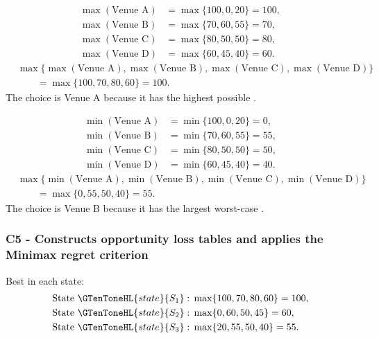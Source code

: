 	\[
	\begin{aligned}
		\max(\text{Venue A}) &= \max\{100,0,20\}=100,\\
		\max(\text{Venue B}) &= \max\{70,60,55\}=70,\\
		\max(\text{Venue C}) &= \max\{80,50,50\}=80,\\
		\max(\text{Venue D}) &= \max\{60,45,40\}=60.
	\end{aligned}
	\]
	\[
	\begin{aligned}
		&\max\{\max(\text{Venue A}),\max(\text{Venue B}),
		\max(\text{Venue C}),\max(\text{Venue D})\}\\
		&\qquad=\max\{100,70,80,60\}
		=100.
	\end{aligned}
	\]
	The  choice is Venue A because it has the highest possible .
	
	\[
	\begin{aligned}
		\min(\text{Venue A}) &= \min\{100,0,20\}=0,\\
		\min(\text{Venue B}) &= \min\{70,60,55\}=55,\\
		\min(\text{Venue C}) &= \min\{80,50,50\}=50,\\
		\min(\text{Venue D}) &= \min\{60,45,40\}=40.
	\end{aligned}
	\]
	\[
	\begin{aligned}
		&\max\{\min(\text{Venue A}),\min(\text{Venue B}),
		\min(\text{Venue C}),\min(\text{Venue D})\}\\
		&\qquad=\max\{0,55,50,40\}
		=55.
	\end{aligned}
	\]
	The  choice is Venue B because it has the largest worst-case .
	
	\subsubsection*{C5 - Constructs opportunity loss tables and applies the Minimax regret criterion}
	\label{subsec:event-venue-3x4-c5}
	
	Best  in each state:
	\[
	\begin{aligned}
		\text{State }\GTenToneHL{state}{S_1}:\;&\max\{100,70,80,60\}=100,\\
		\text{State }\GTenToneHL{state}{S_2}:\;&\max\{0,60,50,45\}=60,\\
		\text{State }\GTenToneHL{state}{S_3}:\;&\max\{20,55,50,40\}=55.
	\end{aligned}
	\]
	
